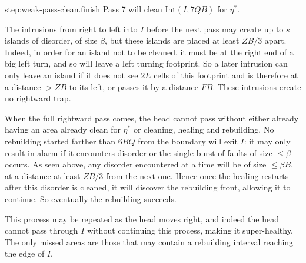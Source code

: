 \documentclass[11pt]{memoir}
\theoremstyle{definition} %
\renewcommand{\le}{\leq}
\def\B{B}
\newcommand{\E}{E} %
\newcommand{\F}{F}
\newcommand{\Int}{\mathrm{Int}} %
\newcommand{\Q}{Q} %
\newcommand{\s}{s} %
\newcommand{\Z}{Z} %
\begin{document}
\begin{Proof}
\begin{step+}{step:weak-pass-clean.finish}
  Pass 7 will clean \( \Int(I, 7\Q\B) \) for \( \eta^{*} \).
\end{step+}
\begin{pproof}
  The intrusions from right to left into \( I \) before the next pass
  may create up to \( \s \) islands of disorder, of size \( \beta \),
  but these islands are placed at least \( \Z\B/3 \) apart.
  Indeed, in order for an island not to be cleaned, it must be at the right end of a big left turn,
  and so will leave a left turning footprint.
  So a later intrusion can only leave an island if it does not see \( 2\E \) cells of this
  footprint and is therefore at a distance \( >\Z\B \) to its left, or passes it by a distance \( \F\B \).
  These intrusions create no rightward trap.

  When the full rightward pass comes, the head 
  cannot pass without either already having an area already clean for \( \eta^{*} \) or
  cleaning, healing and rebuilding.
  No rebuilding started farther than \( 6\B\Q \) from the boundary will exit \( I \): it may only result in
  alarm if it encounters disorder or the single burst of faults of size \( \le\beta \) occurs.
  As seen above, any disorder encountered at a time will be of size \( \le\beta\B \), at a distance
  at least \( \Z\B/3 \) from the next one.
  Hence once the healing restarts after this disorder is cleaned,
  it will discover the rebuilding front, allowing it to continue.
  So eventually the rebuilding succeeds.

  This process may be repeated as the head moves right, and indeed the head cannot pass through \( I \)
  without continuing this process, making it super-healthy.
  The only missed areas are those that may contain a rebuilding interval
  reaching the edge of \( I \).
\end{pproof} %
\end{Proof}


\end{document}

